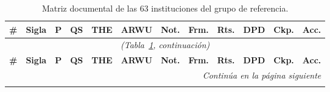 \documentclass[pdflatex,sn-basic,Numbered,iicol]{sn-jnl}
\theoremstyle{thmstyleone}
\theoremstyle{thmstyletwo}
\theoremstyle{thmstylethree}
\begin{document}
\begin{appendices}
\scriptsize
\setlength{\tabcolsep}{2.6pt}
\begin{longtable}{@{}r l c c c c c c c c c c@{}}
	\caption{Matriz documental de las 63 instituciones del grupo de referencia.}\label{tab:mundo}\\
	\toprule
	\textbf{\#} & \textbf{Sigla} & \textbf{P} & \textbf{QS} & \textbf{THE} & \textbf{ARWU} & \textbf{Not.} & \textbf{Frm.} & \textbf{Rts.} & \textbf{DPD} & \textbf{Ckp.} & \textbf{Acc.} \\
	\midrule
	\endfirsthead
	\multicolumn{12}{c}{\textit{(Tabla~\ref{tab:mundo}, continuaci\'on)}}\\
	\toprule
	\textbf{\#} & \textbf{Sigla} & \textbf{P} & \textbf{QS} & \textbf{THE} & \textbf{ARWU} & \textbf{Not.} & \textbf{Frm.} & \textbf{Rts.} & \textbf{DPD} & \textbf{Ckp.} & \textbf{Acc.} \\
	\midrule
	\endhead
	\midrule
	\multicolumn{12}{r}{\textit{Contin\'ua en la p\'agina siguiente}}\\
	\endfoot
	\bottomrule
	\endlastfoot


\end{longtable}
\end{appendices}
\end{document}
